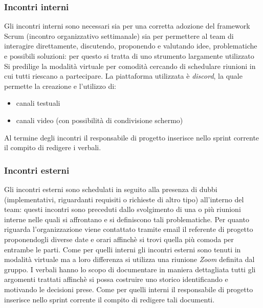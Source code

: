         \subsubsection{Incontri interni}
        Gli incontri interni sono necessari sia per una corretta adozione del framework Scrum (incontro organizzativo settimanale)
        sia per permettere al team di interagire direttamente, discutendo, proponendo e valutando idee, problematiche e possibili 
        soluzioni: per questo si tratta di uno strumento largamente utilizzato
        \newline
        Si predilige la modalità virtuale per comodità cercando di schedulare riunioni in cui tutti riescano a partecipare.
        \newline
        La piattaforma utilizzata è \textit{discord}, la quale permette la creazione e l'utilizzo di:
        \begin{itemize}
            \item canali testuali
            \item canali video (con possibilità di condivisione schermo)
        \end{itemize}
        Al termine degli incontri il responsabile di progetto inserisce nello sprint corrente il compito di redigere i verbali. 

        \subsubsection{Incontri esterni}
        Gli incontri esterni sono schedulati in seguito alla presenza di dubbi (implementativi, riguardanti requisiti o richieste di altro tipo) all'interno del 
        team: questi incontri sono preceduti dallo svolgimento di una o più riunioni interne nelle quali si affrontano e si definiscono tali problematiche.
        \newline
        Per quanto riguarda l'organizzazione viene contattato tramite email il referente di progetto proponendogli diverse date e orari affinchè si trovi quella 
        più comoda per entrambe le parti. 
        \newline
        Come per quelli interni gli incontri esterni sono tenuti in modalità virtuale ma a loro differenza si utilizza una riunione \textit{Zoom} definita dal gruppo. 
        \newline
        I verbali hanno lo scopo di documentare in maniera dettagliata tutti gli argomenti trattati affinchè si possa costruire uno storico identificando
        e motivando le decisioni prese.
        \newline
        Come per quelli interni il responsabile di progetto inserisce nello sprint corrente il compito di redigere tali documenti.

